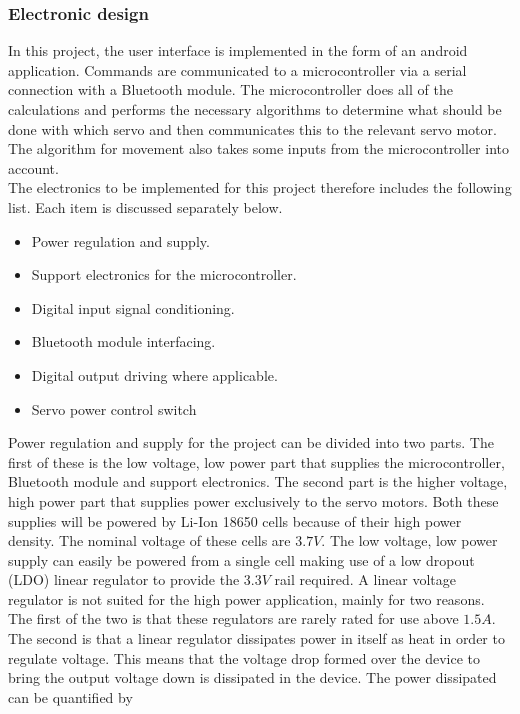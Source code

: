 \subsubsection{Electronic design}
In this project, the user interface is implemented in the form of an android application. Commands are communicated to a microcontroller via a serial connection with a Bluetooth module. The microcontroller does all of the calculations and performs the necessary algorithms to determine what should be done with which servo and then communicates this to the relevant servo motor. The algorithm for movement also takes some inputs from the microcontroller into account.\\

The electronics to be implemented for this project therefore includes the following list. Each item is discussed separately below.
\begin{itemize}
\item Power regulation and supply.
\item Support electronics for the microcontroller.
\item Digital input signal conditioning.
\item Bluetooth module interfacing.
\item Digital output driving where applicable.
\item Servo power control switch
\end{itemize}

Power regulation and supply for the project can be divided into two parts. The first of these is the low voltage, low power part that supplies the microcontroller, Bluetooth module and support electronics. The second part is the higher voltage, high power part that supplies power exclusively to the servo motors. Both these supplies will be powered by Li-Ion 18650 cells because of their high power density. The nominal voltage of these cells are $3.7V$. The low voltage, low power supply can easily be powered from a single cell making use of a low dropout (LDO) linear regulator to provide the $3.3V$ rail required. A linear voltage regulator is not suited for the high power application, mainly for two reasons. The first of the two is that these regulators are rarely rated for use above $1.5A$. The second is that a linear regulator dissipates power in itself as heat in order to regulate voltage. This means that the voltage drop formed over the device to bring the output voltage down is dissipated in the device. The power dissipated can be quantified by

